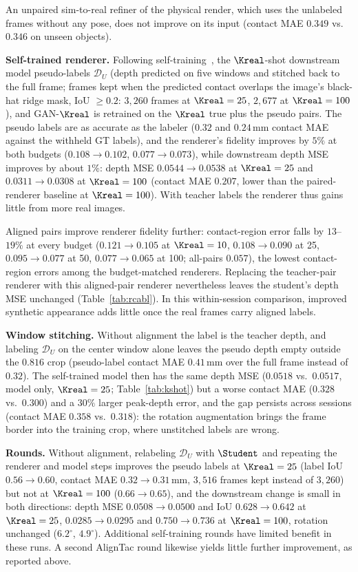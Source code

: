 An unpaired sim-to-real refiner of the physical render, which uses the unlabeled frames without any pose, does not improve on its input (contact MAE $0.349$ vs.\ $0.346$ on unseen objects).

\noindent\textbf{Self-trained renderer.} Following self-training~\cite{lee2013pseudo,xie2020noisy}, the $\Kreal$-shot downstream model pseudo-labels $\mathcal{D}_U$ (depth predicted on five windows and stitched back to the full frame; frames kept when the predicted contact overlaps the image's black-hat ridge mask, IoU $\ge0.2$: $3{,}260$ frames at $\Kreal=25$, $2{,}677$ at $\Kreal=100$), and GAN-$\Kreal$ is retrained on the $\Kreal$ true plus the pseudo pairs. The pseudo labels are as accurate as the labeler ($0.32$ and $0.24\,$mm contact MAE against the withheld GT labels), and the renderer's fidelity improves by $5\%$ at both budgets ($0.108\!\to\!0.102$, $0.077\!\to\!0.073$), while downstream depth MSE improves by about $1\%$: depth MSE $0.0544\!\to\!0.0538$ at $\Kreal=25$ and $0.0311\!\to\!0.0308$ at $\Kreal=100$ (contact MAE $0.207$, lower than the paired-renderer baseline at $\Kreal=100$). With teacher labels the renderer thus gains little from more real images.

Aligned pairs improve renderer fidelity further: contact-region error falls by $13$--$19\%$ at every budget ($0.121\!\to\!0.105$ at $\Kreal=10$, $0.108\!\to\!0.090$ at 25, $0.095\!\to\!0.077$ at 50, $0.077\!\to\!0.065$ at 100; all-pairs $0.057$), the lowest contact-region errors among the budget-matched renderers. Replacing the teacher-pair renderer with this aligned-pair renderer nevertheless leaves the student's depth MSE unchanged (Table~\ref{tab:rcabl}). In this within-session comparison, improved synthetic appearance adds little once the real frames carry aligned labels.

\noindent\textbf{Window stitching.} Without alignment the label is the teacher depth, and labeling $\mathcal{D}_U$ on the center window alone leaves the pseudo depth empty outside the $0.816$ crop (pseudo-label contact MAE $0.41\,$mm over the full frame instead of $0.32$). The self-trained model then has the same depth MSE ($0.0518$ vs.\ $0.0517$, model only, $\Kreal=25$; Table~\ref{tab:kshot}) but a worse contact MAE ($0.328$ vs.\ $0.300$) and a $30\%$ larger peak-depth error, and the gap persists across sessions (contact MAE $0.358$ vs.\ $0.318$): the rotation augmentation brings the frame border into the training crop, where unstitched labels are wrong.

\noindent\textbf{Rounds.} Without alignment, relabeling $\mathcal{D}_U$ with $\Student$ and repeating the renderer and model steps improves the pseudo labels at $\Kreal=25$ (label IoU $0.56\!\to\!0.60$, contact MAE $0.32\!\to\!0.31\,$mm, $3{,}516$ frames kept instead of $3{,}260$) but not at $\Kreal=100$ ($0.66\!\to\!0.65$), and the downstream change is small in both directions: depth MSE $0.0508\!\to\!0.0500$ and IoU $0.628\!\to\!0.642$ at $\Kreal=25$, $0.0285\!\to\!0.0295$ and $0.750\!\to\!0.736$ at $\Kreal=100$, rotation unchanged ($6.2^\circ$, $4.9^\circ$). Additional self-training rounds have limited benefit in these runs. A second AlignTac round likewise yields little further improvement, as reported above.

